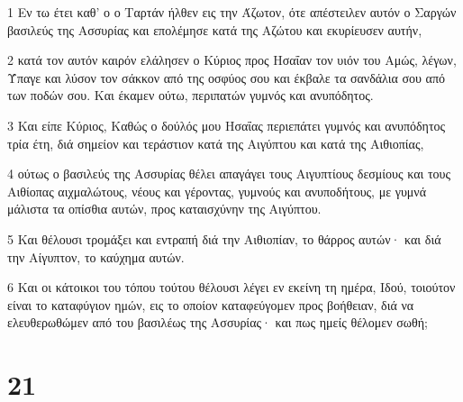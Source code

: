 \par 1 Εν τω έτει καθ' ο ο Ταρτάν ήλθεν εις την Άζωτον, ότε απέστειλεν αυτόν ο Σαργών βασιλεύς της Ασσυρίας και επολέμησε κατά της Αζώτου και εκυρίευσεν αυτήν,
\par 2 κατά τον αυτόν καιρόν ελάλησεν ο Κύριος προς Ησαΐαν τον υιόν του Αμώς, λέγων, Ύπαγε και λύσον τον σάκκον από της οσφύος σου και έκβαλε τα σανδάλια σου από των ποδών σου. Και έκαμεν ούτω, περιπατών γυμνός και ανυπόδητος.
\par 3 Και είπε Κύριος, Καθώς ο δούλός μου Ησαΐας περιεπάτει γυμνός και ανυπόδητος τρία έτη, διά σημείον και τεράστιον κατά της Αιγύπτου και κατά της Αιθιοπίας,
\par 4 ούτως ο βασιλεύς της Ασσυρίας θέλει απαγάγει τους Αιγυπτίους δεσμίους και τους Αιθίοπας αιχμαλώτους, νέους και γέροντας, γυμνούς και ανυποδήτους, με γυμνά μάλιστα τα οπίσθια αυτών, προς καταισχύνην της Αιγύπτου.
\par 5 Και θέλουσι τρομάξει και εντραπή διά την Αιθιοπίαν, το θάρρος αυτών· και διά την Αίγυπτον, το καύχημα αυτών.
\par 6 Και οι κάτοικοι του τόπου τούτου θέλουσι λέγει εν εκείνη τη ημέρα, Ιδού, τοιούτον είναι το καταφύγιον ημών, εις το οποίον καταφεύγομεν προς βοήθειαν, διά να ελευθερωθώμεν από του βασιλέως της Ασσυρίας· και πως ημείς θέλομεν σωθή;

\chapter{21}

